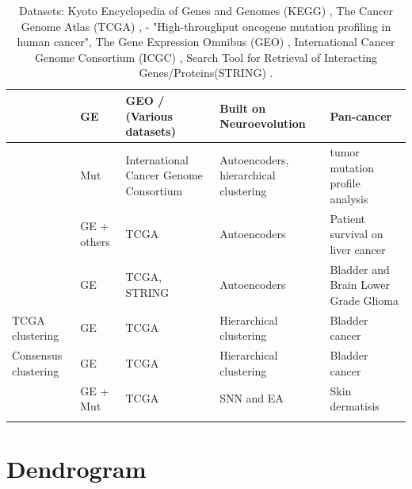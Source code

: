 \begin{appendices}
\begin{small}
\begin{longtable}[!h]{|p{2.0cm}|p{2.5cm}|p{3.5cm}|p{3.0cm}|p{5.5cm}|}
              \citet{Feltes2019-bd} & GE  & GEO / (Various datasets) & Built on Neuroevolution & Pan-cancer \\ \hline
              \citet{Palazzo2019-hx} & Mut & International Cancer Genome Consortium & Autoencoders, hierarchical clustering & tumor mutation profile analysis \\ \hline
              \citet{Chaudhary2018-qj} & GE + others & TCGA & Autoencoders & Patient survival on liver cancer \\ \hline
              \citet{Ma2019-hk} & GE & TCGA, STRING & Autoencoders &  Bladder and Brain Lower Grade Glioma \\ \hline
              TCGA clustering & GE & TCGA & Hierarchical clustering & Bladder cancer  \\ \hline
              Consensus clustering & GE & TCGA & Hierarchical clustering & Bladder cancer \\ \hline
              \citet{Capecci2020-uj} & GE + Mut & TCGA & SNN and EA & Skin dermatisis  \\ \hline
          \caption{Datasets: Kyoto Encyclopedia of Genes and Genomes (KEGG) \cite{Kanehisa2017-wj}, The Cancer Genome Atlas (TCGA) \cite{Tcga2018-sj}, \citet{Thomas2007-yj} - "High-throughput oncogene mutation profiling in human cancer", The Gene Expression Omnibus (GEO) \cite{ Clough2016-zc, Davis2007-at}, International Cancer Genome Consortium (ICGC) \cite{International_Cancer_Genome_Consortium2010-ca}, Search Tool for Retrieval of Interacting Genes/Proteins(STRING) \cite{Szklarczyk2019-pu}. } 
          \label{tab:approaches}
          \end{longtable}
        \end{small}


    \section{Dendrogram} \label{ap:dendogram}



\end{appendices}
